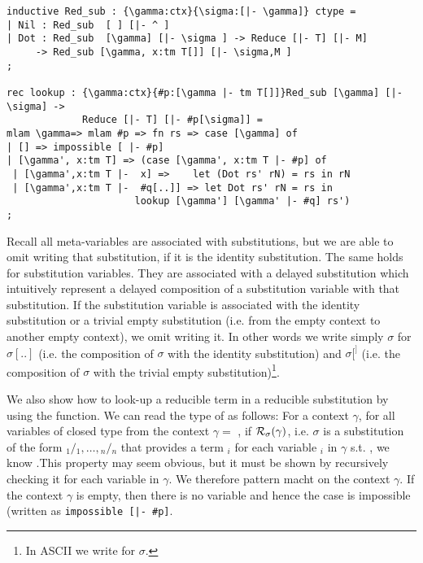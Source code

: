 \begin{lstlisting}
inductive Red_sub : {\gamma:ctx}{\sigma:[|- \gamma]} ctype =
| Nil : Red_sub  [ ] [|- ^ ]
| Dot : Red_sub  [\gamma] [|- \sigma ] -> Reduce [|- T] [|- M]
     -> Red_sub [\gamma, x:tm T[]] [|- \sigma,M ]
;

rec lookup : {\gamma:ctx}{#p:[\gamma |- tm T[]]}Red_sub [\gamma] [|- \sigma] ->
             Reduce [|- T] [|- #p[\sigma]] =
mlam \gamma=> mlam #p => fn rs => case [\gamma] of 
| [] => impossible [ |- #p]
| [\gamma', x:tm T] => (case [\gamma', x:tm T |- #p] of
 | [\gamma',x:tm T |-  x] =>    let (Dot rs' rN) = rs in rN
 | [\gamma',x:tm T |-  #q[..]] => let Dot rs' rN = rs in
                      lookup [\gamma'] [\gamma' |- #q] rs')
;
\end{lstlisting}

Recall all meta-variables are associated with substitutions, but we
are able to omit writing that substitution, if it is the identity substitution. The same
holds for substitution variables. They are associated with a
delayed substitution which intuitively represent a delayed composition of
a substitution variable with that substitution. If the substitution
variable is associated with the identity substitution or a trivial
empty substitution (i.e. from the empty context to another empty
context), we omit writing it. In other words we write simply $\sigma$
for $\sigma[..]$ (i.e. the composition of $\sigma$ with the identity
substitution) and $\sigma[^]$ (i.e. the composition of $\sigma$ with
the trivial empty substitution)\footnote{In ASCII we write 
  for $\sigma$.}.

We also show how to look-up a reducible term in a reducible
substitution by using the  function. We can
read the type of  as follows: For a context $\gamma$, for
all variables  of closed type  from the context
$\gamma = $ , 
if $\mathcal{R}_{\sigma}(\gamma)$, i.e. $\sigma$ is a substitution
of the form $_1/$$_1,
\ldots,$$_n/$$_n$ that provides a term $_i$ 
for each variable $_i$ in $\gamma$ s.t. ,
we know .This property may seem obvious,
but it must be shown by recursively checking it for each variable in
$\gamma$. We therefore pattern macht on the context $\gamma$. If the
context $\gamma$ is empty, then there is no variable and hence the
case is impossible (written as \lstinline!impossible [|- #p]!. 

